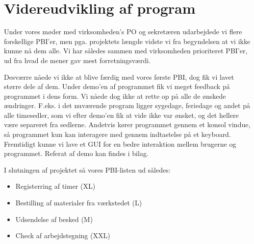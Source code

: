 \section{Videreudvikling af program}

Under vores møder med virksomheden's PO og sekretæren udarbejdede vi flere forskellige PBI'er, men pga. projektets længde vidste vi fra begyndelsen at vi ikke kunne nå dem alle. Vi har således sammen med virksomheden prioriteret PBI'er, ud fra hvad de mener gav mest forretningsværdi.

Desværre nåede vi ikke at blive færdig med vores første PBI, dog fik vi lavet større dele af dem. Under demo'en af programmet fik vi meget feedback på programmet i dens form. Vi nåede dog ikke at rette op på alle de ønskede ændringer. F.eks. i det nuværende program ligger sygedage, feriedage og andet på alle timesedler, som vi efter demo'en fik at vide ikke var ønsket, og det hellere være separeret fra sedlerne. Andetvis kører programmet gennem et konsol vindue, så programmet kun kan interagere med gennem indtastelse på et keyboard. Fremtidigt kunne vi lave et GUI for en bedre interaktion mellem brugerne og programmet. Referat af demo kan findes i bilag.

I slutningen af projektet så vores PBI-listen ud således:
\begin{itemize}
\item Registerring af timer (XL)
\item Bestilling af materialer fra værkstedet (L) 
\item Udsendelse af besked (M)
\item Check af arbejdstegning (XXL)
\end{itemize}


